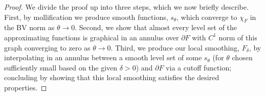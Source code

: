 \documentclass[11pt]{article}
\begin{document}
\begin{proof}
We divide the proof up into three steps, which we now briefly describe. First, by mollification we produce smooth functions, $s_\theta$, which converge to $\chi_F$ in the BV norm as $\theta \rightarrow 0$. Second, we show that almost every level set of the approximating functions is graphical in an annulus over $\partial F$ with $C^1$ norm of this graph converging to zero as $\theta \rightarrow 0$. Third, we produce our local smoothing, $F_\delta$, by interpolating in an annulus between a smooth level set of some $s_\theta$ (for $\theta$ chosen sufficiently small based on the given $\delta > 0$) and $\partial F$ via a cutoff function; concluding by showing that this local smoothing satisfies the desired properties.

\bigskip


\end{proof}
\end{document}
